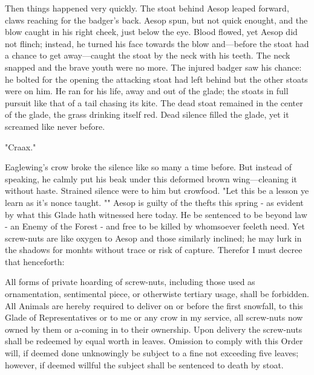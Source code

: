 Then things happened very quickly. The stoat behind Aesop leaped forward, claws reaching for the badger's back. Aesop spun, but not quick enought, and the blow caught in his right cheek, just below the eye. Blood flowed, yet Aesop did not flinch; instead, he turned his face towards the blow and—before the stoat had a chance to get away—caught the stoat by the neck with his teeth. The neck snapped and the brave youth were no more. The injured badger saw his chance: he bolted for the opening the attacking stoat had left behind but the other stoats were on him. He ran for his life, away and out of the glade; the stoats in full pursuit like that of a tail chasing its kite.%
  The dead stoat remained in the center of the glade, the grass drinking itself red. Dead silence filled the glade, yet it screamed like never before.%

"Craax."

Eaglewing's crow broke the silence like so many a time before. But instead of speaking, he calmly put his beak under this deformed brown wing—cleaning it without haste. Strained silence were to him but crowfood. "Let this be a lesson ye learn as it's nonce taught. ""
Aesop is guilty of the thefts this spring - as evident by what this Glade hath witnessed here today. He be sentenced to be beyond law - an Enemy of the Forest - and free to be killed by whomsoever feeleth need. Yet screw-nuts are like oxygen to Aesop and those similarly inclined; he may lurk in the shadows for monhts without trace or risk of capture. Therefor I must decree that henceforth: 

	All forms of private hoarding of screw-nuts, including those used as ornamentation, sentimental piece, or otherwiste tertiary usage, shall be forbidden. All Animals are hereby required to deliver on or before the first snowfall, to this Glade of Representatives or to me or any crow in my service, all screw-nuts now owned by them or a-coming in to their ownership. Upon delivery the screw-nuts shall be redeemed by equal worth in leaves. Omission to comply with this Order will, if deemed done unknowingly be subject to a fine not exceeding five leaves; however, if deemed willful the subject shall be sentenced to death by stoat.


